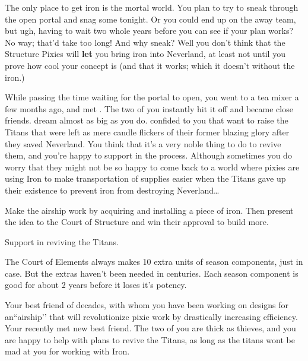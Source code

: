 \documentclass[char]{PP}
\begin{document}
The only place to get iron is the mortal world. You plan to try to sneak through the open portal and snag some tonight. Or you could end up on the away team, but ugh, having to wait two whole years before you can see if your plan works? No way; that'd take too long! And why sneak? Well you don't think that the Structure Pixies will \textbf{let} you bring iron into Neverland, at least not until you prove how cool your concept is (and that it works; which it doesn't without the iron.)

While passing the time waiting for the portal to open, you went to a tea mixer a few months ago, and met \cFTitan{}. The two of you instantly hit it off and became close friends. \cFTitan{\They} dream\cFTitan{\plural} almost as big as you do. \cFTitan{} confided to you that \cFTitan{\they} want to raise the Titans that were left as mere candle flickers of their former blazing glory after they saved Neverland. You think that it's a very noble thing to do to revive them, and you're happy to support \cFTitan{} in the process. Although sometimes you do worry that they might not be so happy to come back to a world where pixies are using Iron to make transportation of supplies easier when the Titans gave up their existence to prevent iron from destroying Neverland\ldots


\begin{itemz}
	\item Make the airship work by acquiring and installing a piece of iron. Then present the idea to the Court of Structure and win their approval to build more.
	\item Support \cFTitan{} in reviving the Titans.
\end{itemz}

\begin{itemz}[Notes]
	\item The Court of Elements always makes 10 extra units of season components, just in case. But the extras haven't been needed in centuries. Each season component is good for about 2 years before it loses it's potency.
\end{itemz}

\begin{contacts}
	\contact{\cMAirship{}} Your best friend of decades, with whom you have been working on designs for an``airship'’ that will revolutionize pixie work by drastically increasing efficiency.
	\contact{\cFTitan{}} Your recently met new best friend. The two of you are thick as thieves, and you are happy to help \cFTitan{\them} with \cFTitan{\their} plans to revive the Titans, as long as the titans wont be mad at you for working with Iron.
\end{contacts}
\end{document}
